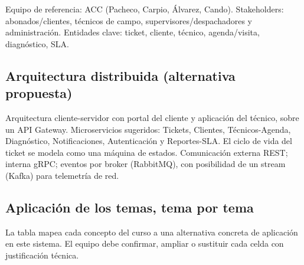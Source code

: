 \documentclass[11pt]{article}
\begin{document}
Equipo de referencia: ACC (Pacheco, Carpio, Álvarez, Cando). Stakeholders: abonados/clientes, técnicos de campo, supervisores/despachadores y administración. Entidades clave: ticket, cliente, técnico, agenda/visita, diagnóstico, SLA.

\subsection{Arquitectura distribuida (alternativa propuesta)}
Arquitectura cliente-servidor con portal del cliente y aplicación del técnico, sobre un API Gateway. Microservicios sugeridos: Tickets, Clientes, Técnicos-Agenda, Diagnóstico, Notificaciones, Autenticación y Reportes-SLA. El ciclo de vida del ticket se modela como una máquina de estados. Comunicación externa REST; interna gRPC; eventos por broker (RabbitMQ), con posibilidad de un stream (Kafka) para telemetría de red.

\subsection{Aplicación de los temas, tema por tema}
La tabla mapea cada concepto del curso a una alternativa concreta de aplicación en este sistema. El equipo debe confirmar, ampliar o sustituir cada celda con justificación técnica.
\end{document}
